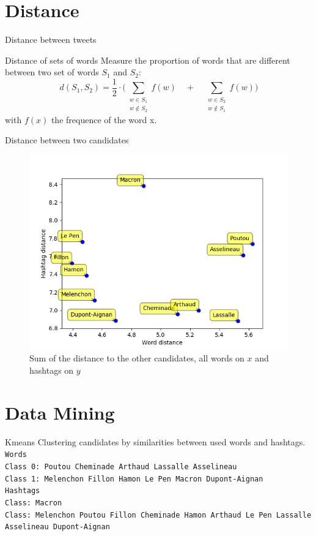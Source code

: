 \documentclass{beamer}
\begin{document}
\section{Distance}
\begin{frame}{Distance between tweets}
\begin{block}{Distance of sets of words}
Measure the proportion of words that are different between two set of words $S_1$ and $S_2$:
\[
d(S_1, S_2)= \frac{1}{2} \cdot \Big( \sum_{\substack{w \in S_1\\w \notin S_2}}f(w) \quad + \quad \sum_{\substack{w \in S_2\\w \notin S_1}} f(w) \Big) 
\]
with $f(x)$ the frequence of the word x.
\end{block}
\end{frame}

\begin{frame}{Distance between two candidates}
\begin{figure}

\includegraphics[height= 0.6\textheight]{distances.png}

\caption{Sum of the distance to the other candidates, all words on $x$ and hashtags on $y$}
\end{figure}
\end{frame}

\section{Data Mining}
\begin{frame}{Kmeans}
Clustering candidates by similarities between used words and hashtags.
\bigskip
\texttt{\\
Words\\
Class 0: Poutou Cheminade Arthaud Lassalle Asselineau\\
Class 1: Melenchon Fillon Hamon Le Pen Macron Dupont-Aignan\\
\bigskip
Hashtags\\
Class: Macron\\
Class: Melenchon Poutou Fillon Cheminade Hamon Arthaud Le Pen Lassalle Asselineau Dupont-Aignan\\
}
\end{frame}
\end{document}
